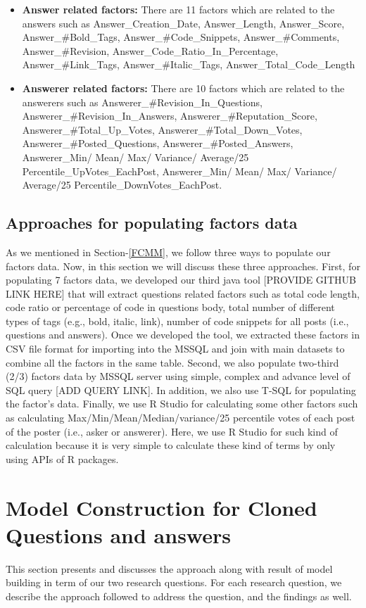 \documentclass[conference]{IEEEtran}
\begin{document}
\begin{itemize}
	\item \textbf{Answer related factors: } There are 11 factors which are related to the answers such as Answer\_Creation\_Date, Answer\_Length, Answer\_Score, Answer\_\#Bold\_Tags, Answer\_\#Code\_Snippets, Answer\_\#Comments, Answer\_\#Revision, Answer\_Code\_Ratio\_In\_Percentage,  Answer\_\#Link\_Tags, Answer\_\#Italic\_Tags, Answer\_Total\_Code\_Length
	\item \textbf{Answerer related factors: } There are 10 factors which are related to the answerers such as Answerer\_\#Revision\_In\_Questions, Answerer\_\#Revision\_In\_Answers, Answerer\_\#Reputation\_Score, Answerer\_\#Total\_Up\_Votes, Answerer\_\#Total\_Down\_Votes, Answerer\_\#Posted\_Questions, Answerer\_\#Posted\_Answers, 
	Answerer\_Min/ Mean/ Max/ Variance/ Average/25 Percentile\_UpVotes\_EachPost, Answerer\_Min/ Mean/ Max/ Variance/ Average/25 Percentile\_DownVotes\_EachPost.
	
\end{itemize}

\subsection{Approaches for populating factors data}
As we mentioned in Section-\ref{FCMM}, we follow three ways to populate our factors data. Now, in this section we will discuss these three approaches. First, for populating 7 factors data, we developed our third java tool [PROVIDE GITHUB LINK HERE] that will extract questions related factors such as total code length, code ratio or percentage of code in questions body, total number of different types of tags (e.g., bold, italic, link), number of code snippets for all posts (i.e., questions and answers). Once we developed the tool, we extracted these factors in CSV file format for importing into the MSSQL and join with main datasets to combine all the factors in the same table. Second, we also populate two-third (2/3) factors data by MSSQL server using simple, complex and advance level of SQL query [ADD QUERY LINK]. In addition, we also use T-SQL for populating the factor's data. Finally, we use R Studio for calculating some other factors such as  calculating Max/Min/Mean/Median/variance/25 percentile votes of each post of the poster (i.e., asker or answerer). Here, we use R Studio for such kind of calculation because it is very simple to calculate these kind of terms by only using APIs of R packages. 


\section{Model Construction for Cloned Questions and answers}
This section presents and discusses the approach along with result of model building in term of our two research questions. For each research question, we describe the approach followed to address the question, and the findings as well.
\end{document}
